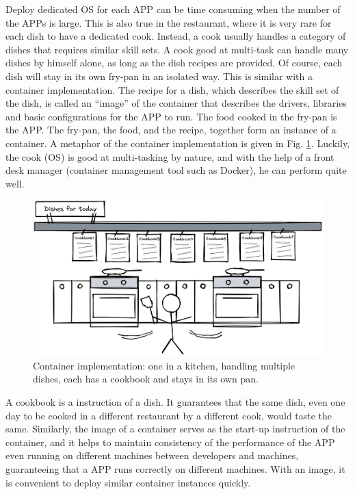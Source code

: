Deploy dedicated OS for each APP can be time consuming when the number of the APPs is large. This is also true in the restaurant, where it is very rare for each dish to have a dedicated cook. Instead, a cook usually handles a category of dishes that requires similar skill sets. A cook good at multi-task can handle many dishes by himself alone, as long as the dish recipes are provided. Of course, each dish will stay in its own fry-pan in an isolated way. This is similar with a container implementation. The recipe for a dish, which describes the skill set of the dish, is called an ``image'' of the container that describes the drivers, libraries and basic configurations for the APP to run. The food cooked in the fry-pan is the APP. The fry-pan, the food, and the recipe, together form an instance of a container. A metaphor of the container implementation is given in Fig. \ref{ch:vac:fig:multitaskcook}. Luckily, the cook (OS) is good at multi-tasking by nature, and with the help of a front desk manager (container management tool such as Docker), he can perform quite well.
\begin{figure}
	\centering
	\includegraphics[width=350pt]{chapters/ch-virtualization-and-containerization/figures/multitaskcook.png}
	\caption{Container implementation: one in a kitchen, handling multiple dishes, each has a cookbook and stays in its own pan.} \label{ch:vac:fig:multitaskcook}
\end{figure}

A cookbook is a instruction of a dish. It guarantees that the same dish, even one day to be cooked in a different restaurant by a different cook, would taste the same. Similarly, the image of a container serves as the start-up instruction of the container, and it helps to maintain consistency of the performance of the APP even running on different machines between developers and machines, guaranteeing that a APP runs correctly on different machines. With an image, it is convenient to deploy similar container instances quickly.

